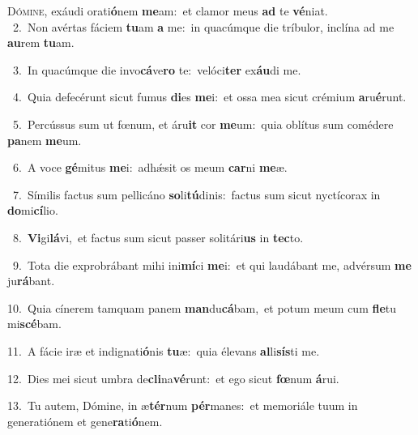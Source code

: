 \lettrine{\initial\textcolor{\initialcolor}{D}}{ómine,} exáudi orati\-\textbf{ó}\-nem \textbf{me}\-am:~\star et clamor meus \textbf{ad} te \textbf{vé}\-niat.\\
{\numbfont\textcolor{\numbcolor}{~2.}}~Non avértas fáciem \textbf{tu}\-am \textbf{a} me:~\star in quacúmque die tríbulor, inclína ad me \textbf{au}\-rem \textbf{tu}\-am.\par
{\numbfont\textcolor{\numbcolor}{~3.}}~In quacúmque die invo\-\textbf{cá}\-ve\textbf{ro} te:~\star velóci\textbf{ter} ex\-\textbf{áu}\-di me.\par
{\numbfont\textcolor{\numbcolor}{~4.}}~Quia defecérunt sicut fumus \textbf{di}\-es \textbf{me}\-i:~\star et ossa mea sicut crémium \textbf{a}\-ru\-\textbf{é}\-runt.\par
{\numbfont\textcolor{\numbcolor}{~5.}}~Percússus sum ut fœnum, et áru\textbf{it} cor \textbf{me}\-um:~\star quia oblítus sum comédere \textbf{pa}\-nem \textbf{me}\-um.\par
{\numbfont\textcolor{\numbcolor}{~6.}}~A voce \textbf{gé}\-mitus \textbf{me}\-i:~\star adhǽsit os meum \textbf{car}\-ni \textbf{me}\-æ.\par
{\numbfont\textcolor{\numbcolor}{~7.}}~Símilis factus sum pellicáno \textbf{so}\-li\-\textbf{tú}\-dinis:~\star factus sum sicut nyctícorax in \textbf{do}\-mi\-\textbf{cí}\-lio.\par
{\numbfont\textcolor{\numbcolor}{~8.}}~\-\textbf{Vi}\-gi\-\textbf{lá}\-vi,~\star et factus sum sicut passer solitári\textbf{us} in \textbf{tec}\-to.\par
{\numbfont\textcolor{\numbcolor}{~9.}}~Tota die exprobrábant mihi ini\-\textbf{mí}\-ci \textbf{me}\-i:~\star et qui laudábant me, advérsum \textbf{me} ju\-\textbf{rá}\-bant.\par
{\numbfont\textcolor{\numbcolor}{10.}}~Quia cínerem tamquam panem \textbf{man}\-du\-\textbf{cá}\-bam,~\star et potum meum cum \textbf{fle}\-tu mi\-\textbf{scé}\-bam.\par
{\numbfont\textcolor{\numbcolor}{11.}}~A fácie iræ et indignati\-\textbf{ó}\-nis \textbf{tu}\-æ:~\star quia élevans \textbf{al}\-li\-\textbf{sís}\-ti me.\par
{\numbfont\textcolor{\numbcolor}{12.}}~Dies mei sicut umbra de\-\textbf{cli}\-na\-\textbf{vé}\-runt:~\star et ego sicut \textbf{fœ}\-num \textbf{á}\-rui.\par
{\numbfont\textcolor{\numbcolor}{13.}}~Tu autem, Dómine, in æ\-\textbf{tér}\-num \textbf{pér}\-manes:~\star et memoriále tuum in generatiónem et gene\-\textbf{ra}\-ti\-\textbf{ó}\-nem.\par
